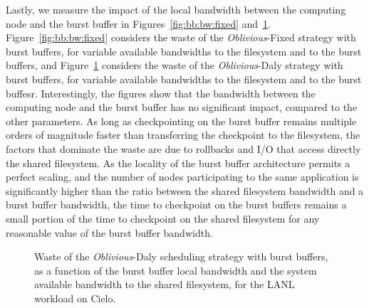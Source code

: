\documentclass[two]{article}
\newcommand{\nocoop}{\emph{Oblivious}\xspace}
\def\propfixed{\nocoop-Fixed\xspace}
\def\propdaly{\nocoop-Daly\xspace}
\begin{document}
Lastly, we measure the impact of the local bandwidth between the
computing node and the burst buffer in Figures~\ref{fig:bb:bw:fixed}
and~\ref{fig:bb:bw:daly}. Figure~\ref{fig:bb:bw:fixed} considers the
waste of the \propfixed strategy with burst buffers, for variable
available bandwidths to the filesystem and to the burst
buffers, and Figure~\ref{fig:bb:bw:daly} considers the waste of the
\propdaly strategy with burst buffers,  for variable available bandwidths
to the filesystem and to the burst buffesr. Interestingly, the figures
show that the bandwidth between the computing node and the burst
buffer has no significant impact, compared to the other parameters. As
long as checkpointing on the burst buffer remains multiple orders of
magnitude faster than transferring the checkpoint to the filesystem,
the factors that dominate the waste are due to rollbacks and I/O
that access directly the shared filesystem. As the locality of the burst
buffer architecture permits a perfect scaling, and the number of nodes
participating to the same application is significantly higher than the
ratio between the shared filesystem bandwidth and a burst buffer
bandwidth, the time to checkpoint on the burst buffers remains
a small portion of the time to checkpoint on the shared filesystem for
any reasonable value of the burst buffer bandwidth.

\begin{figure}
  \begin{minipage}{0.49\linewidth}
    \begin{center}
      \resizebox{\linewidth}{!}{}
    \end{center}
    \caption{Waste of the \propfixed scheduling
      strategy with burst buffers,  as a function of the burst buffer local bandwidth and the system
      available bandwidth to the shared filesystem,  for the LANL workload on
      Cielo.\label{fig:bb:bw:fixed}}
  \end{minipage}
  \begin{minipage}{0.49\linewidth}
    \begin{center}
      \resizebox{\linewidth}{!}{}
    \end{center}
    \caption{Waste of the \propdaly scheduling
      strategy  with burst buffers,  as a function of the burst buffer local bandwidth and the system
      available bandwidth to the shared filesystem, for the LANL workload on
      Cielo.\label{fig:bb:bw:daly}}
  \end{minipage}
\end{figure}
\end{document}
